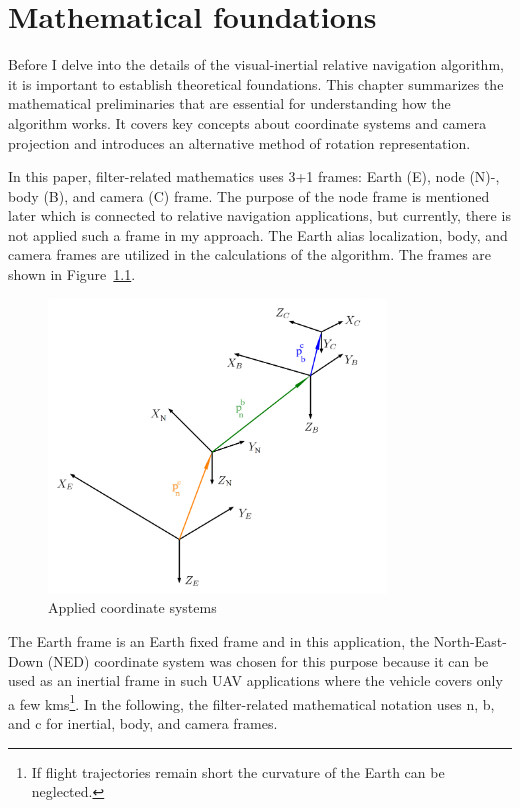\chapter{Mathematical foundations}\label{chap:math}

Before I delve into the details of the visual-inertial relative navigation algorithm, it is important to establish theoretical foundations. This chapter summarizes the mathematical preliminaries that are essential for understanding how the algorithm works. It covers key concepts about coordinate systems and camera projection and introduces an alternative method of rotation representation. 

In this paper, filter-related mathematics uses 3+1 frames: Earth (E), node (N)-, body (B), and camera (C) frame. The purpose of the node frame is mentioned later which is connected to relative navigation applications, but currently, there is not applied such a frame in my approach. The Earth alias localization, body, and camera frames are utilized in the calculations of the algorithm. The frames are shown in Figure~\ref{fig:coord-sys}. 
\begin{figure}[!ht]
    \centering
    \includegraphics[width=0.8\textwidth]{figures/Coord_sys.png}
    \caption{Applied coordinate systems}\label{fig:coord-sys}
\end{figure}

The Earth frame is an Earth fixed frame and in this application, the North-East-Down (NED) coordinate system was chosen for this purpose because it can be used as an inertial frame in such UAV applications where the vehicle covers only a few \si{\kilo\meter}s\footnote{If flight trajectories remain short the curvature of the Earth can be neglected.}. In the following, the filter-related mathematical notation uses n, b, and c for inertial, body, and camera frames.

